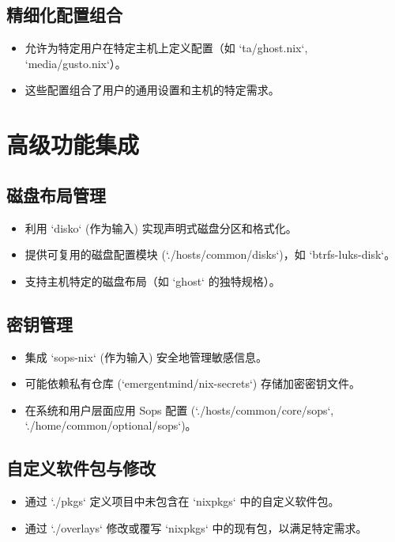 \documentclass[11pt, a4paper]{article}
\begin{document}
    \subsection{精细化配置组合}
        \begin{itemize}
            \item 允许为特定用户在特定主机上定义配置（如 `ta/ghost.nix`, `media/gusto.nix`）。
            \item 这些配置组合了用户的通用设置和主机的特定需求。
        \end{itemize}

\section{高级功能集成}
    \subsection{磁盘布局管理}
        \begin{itemize}
            \item 利用 `disko` (作为输入) 实现声明式磁盘分区和格式化。
            \item 提供可复用的磁盘配置模块 (`./hosts/common/disks`)，如 `btrfs-luks-disk`。
            \item 支持主机特定的磁盘布局（如 `ghost` 的独特规格）。
        \end{itemize}
    \subsection{密钥管理}
        \begin{itemize}
            \item 集成 `sops-nix` (作为输入) 安全地管理敏感信息。
            \item 可能依赖私有仓库 (`emergentmind/nix-secrets`) 存储加密密钥文件。
            \item 在系统和用户层面应用 Sops 配置 (`./hosts/common/core/sops`, `./home/common/optional/sops`)。
        \end{itemize}
    \subsection{自定义软件包与修改}
        \begin{itemize}
            \item 通过 `./pkgs` 定义项目中未包含在 `nixpkgs` 中的自定义软件包。
            \item 通过 `./overlays` 修改或覆写 `nixpkgs` 中的现有包，以满足特定需求。
        \end{itemize}
\end{document}
